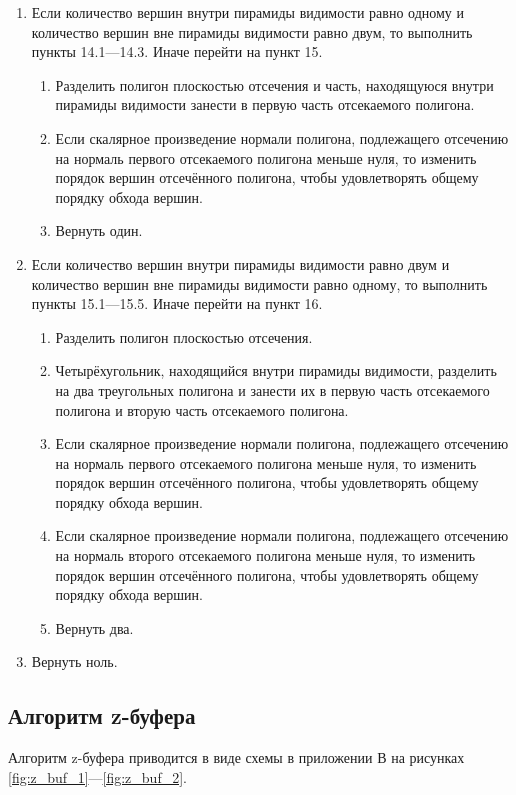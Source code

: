 \begin{enumerate}
\item Если количество вершин внутри пирамиды видимости равно одному и количество вершин вне пирамиды видимости равно двум, то выполнить пункты 14.1---14.3. Иначе перейти на пункт 15.
\begin{enumerate}
\item Разделить полигон плоскостью отсечения и часть, находящуюся внутри пирамиды видимости занести в первую часть отсекаемого полигона. 
\item Если скалярное произведение нормали полигона, подлежащего отсечению на нормаль первого отсекаемого полигона меньше нуля, то изменить порядок вершин отсечённого полигона, чтобы удовлетворять общему порядку обхода вершин.
\item Вернуть один.
\end{enumerate}
\item Если количество вершин внутри пирамиды видимости равно двум и количество вершин вне пирамиды видимости равно одному, то выполнить пункты 15.1---15.5. Иначе перейти на пункт 16.
\begin{enumerate}
\item Разделить полигон плоскостью отсечения.
\item Четырёхугольник, находящийся внутри пирамиды видимости, разделить на два треугольных полигона и занести их в первую часть отсекаемого полигона и вторую часть отсекаемого полигона.
\item Если скалярное произведение нормали полигона, подлежащего отсечению на нормаль первого отсекаемого полигона меньше нуля, то изменить порядок вершин отсечённого полигона, чтобы удовлетворять общему порядку обхода вершин.
\item Если скалярное произведение нормали полигона, подлежащего отсечению на нормаль второго отсекаемого полигона меньше нуля, то изменить порядок вершин отсечённого полигона, чтобы удовлетворять общему порядку обхода вершин.
\item Вернуть два.
\end{enumerate}
\item Вернуть ноль.
\end{enumerate}

\subsection{Алгоритм z-буфера}
Алгоритм z-буфера приводится в виде схемы в приложении В на рисунках \ref{fig:z_buf_1}---\ref{fig:z_buf_2}.

